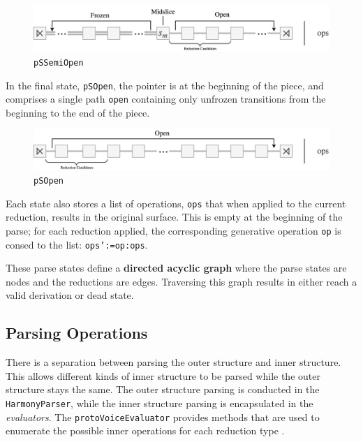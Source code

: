 \documentclass[12pt,a4paper,twoside,openany]{report} \usepackage[pdfborder={0 0 0}]{hyperref}    %
\theoremstyle{definition} \newtheorem{definition}{Definition}[section]
\begin{document}
      \begin{figure}[ht] \centering\includegraphics[width=\textwidth]{impl/parseState/semiopen.png}
      \caption{\texttt{pSSemiOpen}} \label{fig:pSSemiOpen} \end{figure}

      In the final state, \texttt{pSOpen}, the pointer is at the beginning of the piece, and comprises a single path
      \texttt{open} containing only unfrozen transitions from the beginning to the end of the piece.

      \begin{figure}[ht] \centering\includegraphics[width=\textwidth]{impl/parseState/open.png} \caption{\texttt{pSOpen}}
      \label{fig:pSOpen} \end{figure}

      Each state also stores a list of operations, \texttt{ops} that when applied to the current reduction, results in the
      original surface. This is empty at the beginning of the parse; for each reduction applied, the corresponding
      generative operation \texttt{op} is consed to the list: \texttt{ops':=op:ops}. 

      These parse states define a \textbf{directed acyclic graph} where the parse states are nodes and the reductions are edges. 
      Traversing this graph results in either reach a valid derivation or dead state. 

      \subsection{Parsing Operations} 
      There is a separation between parsing the outer structure and inner structure. This allows different kinds of
      inner structure to be parsed while the outer structure stays the same. The outer structure parsing is conducted
      in the \texttt{HarmonyParser}, while the inner structure parsing is encapsulated in the \textit{evaluators}. 
      The \texttt{protoVoiceEvaluator} \cite{finkensiepModelingInferringProtovoice2021} provides methods that are used 
      to enumerate the possible inner operations for each reduction type \footnotemark. 
\end{document}
